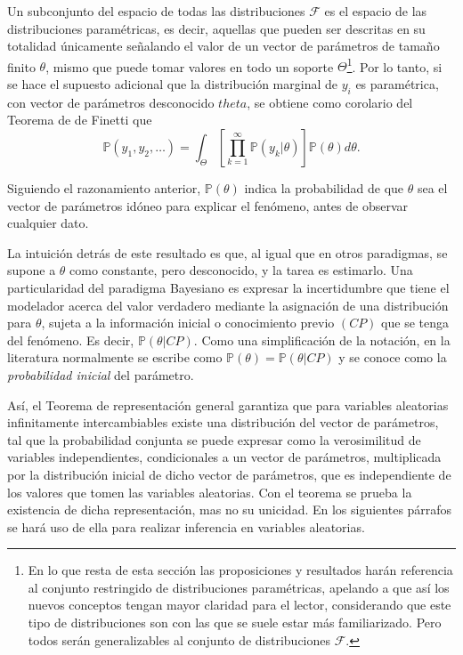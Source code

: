 Un subconjunto del espacio de todas las distribuciones $\mathcal{F}$ es el espacio de las distribuciones param\'etricas, es decir, aquellas que pueden ser descritas en su totalidad \'unicamente señalando el valor de un vector de par\'ametros de tamaño finito $\theta$, mismo que puede tomar valores en todo un soporte $\Theta$\footnote{En lo que resta de esta secci\'on las proposiciones y resultados har\'an referencia al conjunto restringido de distribuciones param\'etricas, apelando a que as\'i los nuevos conceptos tengan mayor claridad para el lector, considerando que este tipo de distribuciones son con las que se suele estar m\'as familiarizado. Pero todos ser\'an generalizables al conjunto de distribuciones $\mathcal{F}$.}. Por lo tanto, si se hace el supuesto adicional que la distribuci\'on marginal de $y_i$ es param\'etrica, con vector de par\'ametros desconocido $theta$, se obtiene como corolario del Teorema de de Finetti que
\begin{equation*}
    \mathbb{P}(y_1,y_2,\ldots) =
    \int_{\Theta}\left[\prod_{k=1}^\infty \mathbb{P}(y_k|\theta)\right]\mathbb{P}(\theta)d\theta.
\end{equation*}

Siguiendo el razonamiento anterior, $\mathbb{P}(\theta)$ indica la probabilidad de que $\theta$ sea el vector de par\'ametros id\'oneo para explicar el fen\'omeno, antes de observar cualquier dato.

La intuici\'on detr\'as de este resultado es que, al igual que en otros paradigmas, se supone a $\theta$ como constante, pero desconocido, y la tarea es estimarlo. Una particularidad del paradigma Bayesiano es expresar la incertidumbre que tiene el modelador acerca del valor verdadero mediante la asignaci\'on de una distribuci\'on para $\theta$, sujeta a la informaci\'on inicial o conocimiento previo $(CP)$ que se tenga del fen\'omeno. Es decir, $\mathbb{P}(\theta|CP)$. Como una simplificaci\'on de la notaci\'on, en la literatura normalmente se escribe como $\mathbb{P}(\theta) = \mathbb{P}(\theta|CP)$ y se conoce como la \textit{probabilidad inicial} del par\'ametro.

As\'i, el Teorema de representaci\'on general garantiza que para variables aleatorias infinitamente intercambiables existe una distribuci\'on del vector de par\'ametros, tal que la probabilidad conjunta se puede expresar como la verosimilitud de variables independientes, condicionales a un vector de par\'ametros, multiplicada por la distribuci\'on inicial de dicho vector de par\'ametros, que es independiente de los valores que tomen las variables aleatorias. Con el teorema se prueba la existencia de dicha representaci\'on, mas no su unicidad. En los siguientes p\'arrafos se har\'a uso de ella para realizar inferencia en variables aleatorias.

